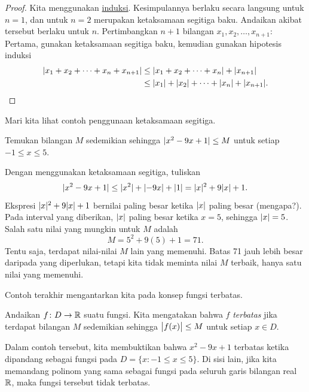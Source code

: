 \begin{proof}
Kita menggunakan \hyperref[induction:thm]{induksi}.
Kesimpulannya berlaku secara langsung untuk $n=1$, dan
untuk $n=2$ merupakan ketaksamaan segitiga baku.  Andaikan akibat tersebut
berlaku untuk $n$.  Pertimbangkan $n+1$ bilangan $x_1,x_2,\ldots,x_{n+1}$:
Pertama, gunakan ketaksamaan segitiga baku, kemudian gunakan hipotesis
induksi
\begin{equation*}
\begin{split}
\lvert {x_1 + x_2 + \cdots + x_n + x_{n+1}} \rvert & \leq
\lvert {x_1 + x_2 + \cdots + x_n} \rvert + \lvert {x_{n+1}} \rvert \\
& \leq
\lvert {x_1} \rvert + \lvert {x_2} \rvert + \cdots + \lvert {x_n} \rvert + \lvert {x_{n+1}} \rvert .  \qedhere
\end{split}
\end{equation*}
\end{proof}

Mari kita lihat contoh penggunaan ketaksamaan segitiga.

\begin{example}
Temukan bilangan $M$ sedemikian sehingga $\lvert {x^2-9x+1} \rvert \leq M$ untuk setiap $-1 \leq x \leq
5$.

Dengan menggunakan ketaksamaan segitiga, tuliskan
\begin{equation*}
\lvert {x^2-9x+1} \rvert \leq \lvert {x^2} \rvert+\lvert {-9x} \rvert+\lvert {1} \rvert
=
\lvert {x} \rvert^2+9\lvert {x} \rvert+1 .
\end{equation*}
Ekspresi
$\lvert {x} \rvert^2+9\lvert {x} \rvert+1$ bernilai paling besar ketika $\lvert {x} \rvert$ paling besar (mengapa?).  Pada interval
yang diberikan, $\lvert {x} \rvert$ paling besar ketika $x=5$, sehingga $\lvert {x} \rvert=5$.  Salah satu
nilai yang mungkin untuk $M$ adalah
\begin{equation*}
M = 5^2+9(5)+1 = 71 .
\end{equation*}
Tentu saja, terdapat nilai-nilai $M$ lain yang memenuhi.  Batas 71
jauh lebih besar daripada yang
diperlukan, tetapi kita tidak meminta nilai $M$ terbaik, hanya satu nilai yang memenuhi.
\end{example}

Contoh terakhir mengantarkan kita pada konsep fungsi terbatas.

\begin{defn}
Andaikan $f \colon D \to {\mathbb{R}}$ suatu fungsi.  Kita mengatakan bahwa $f$
\emph{terbatas}
jika terdapat bilangan $M$
sedemikian sehingga $\bigl\lvert {f(x)} \bigr\rvert \leq M$ untuk setiap $x \in D$.
\end{defn}

Dalam contoh tersebut, kita membuktikan bahwa $x^2-9x+1$ terbatas ketika dipandang sebagai
fungsi pada $D = \{ x : -1 \leq x \leq 5 \}$.  Di sisi lain,
jika kita memandang polinom yang sama sebagai fungsi pada seluruh garis bilangan real ${\mathbb{R}}$,
maka fungsi tersebut tidak terbatas.

